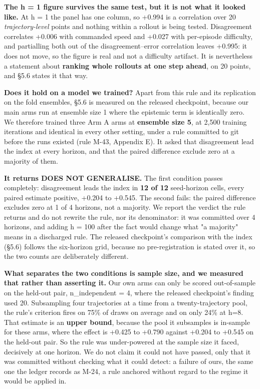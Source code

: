 \documentclass[10pt]{article}
\begin{document}
\textbf{The h = 1 figure survives the same test, but it is not what it looked like.} At h = 1 the panel has one column, so +0.994 is a correlation over 20 \emph{trajectory-level} points and nothing within a rollout is being tested. Disagreement correlates +0.006 with commanded speed and +0.027 with per-episode difficulty, and partialling both out of the disagreement--error correlation leaves +0.995: it does not move, so the figure is real and not a difficulty artifact. It is nevertheless a statement about \textbf{ranking whole rollouts at one step ahead}, on 20 points, and \S{}5.6 states it that way.

\textbf{Does it hold on a model we trained?} Apart from this rule and its replication on the fold ensembles, \S{}5.6 is measured on the released checkpoint, because our main arms run at ensemble size 1 where the epistemic term is identically zero. We therefore trained three Arm A arms at \textbf{ensemble size 5}, at 2,500 training iterations and identical in every other setting, under a rule committed to git before the runs existed (rule M-43, Appendix E). It asked that disagreement lead the index at every horizon, and that the paired difference exclude zero at a majority of them.

\textbf{It returns DOES NOT GENERALISE.} The first condition passes completely: disagreement leads the index in \textbf{12 of 12} seed-horizon cells, every paired estimate positive, +0.204 to +0.545. The second fails: the paired difference excludes zero at 1 of 4 horizons, not a majority. We report the verdict the rule returns and do not rewrite the rule, nor its denominator: it was committed over 4 horizons, and adding h = 100 after the fact would change what "a majority" means in a discharged rule. The released checkpoint's comparison with the index (\S{}5.6) follows the six-horizon grid, because no pre-registration is stated over it, so the two counts are deliberately different.

\textbf{What separates the two conditions is sample size, and we measured that rather than asserting it.} Our own arms can only be scored out-of-sample on the held-out pair, n\_independent = 4, where the released checkpoint's finding used 20. Subsampling four trajectories at a time from a twenty-trajectory pool, the rule's criterion fires on 75\% of draws on average and on only 24\% at h=8. That estimate is an \textbf{upper bound}, because the pool it subsamples is in-sample for these arms, where the effect is +0.425 to +0.790 against +0.204 to +0.545 on the held-out pair. So the rule was under-powered at the sample size it faced, decisively at one horizon. We do not claim it could not have passed, only that it was committed without checking what it could detect: a failure of ours, the same one the ledger records as M-24, a rule anchored without regard to the regime it would be applied in.
\end{document}
